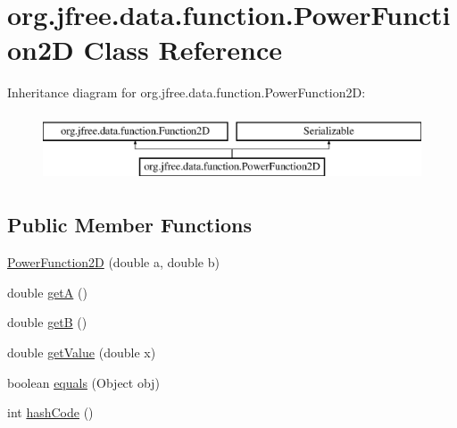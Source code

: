 \hypertarget{classorg_1_1jfree_1_1data_1_1function_1_1_power_function2_d}{}\section{org.\+jfree.\+data.\+function.\+Power\+Function2D Class Reference}
\label{classorg_1_1jfree_1_1data_1_1function_1_1_power_function2_d}
Inheritance diagram for org.\+jfree.\+data.\+function.\+Power\+Function2D\+:\begin{figure}[H]
\begin{center}
\leavevmode
\includegraphics[height=2.000000cm]{classorg_1_1jfree_1_1data_1_1function_1_1_power_function2_d}
\end{center}
\end{figure}
\subsection*{Public Member Functions}
\begin{DoxyCompactItemize}
\item 
\mbox{\hyperlink{classorg_1_1jfree_1_1data_1_1function_1_1_power_function2_d_ac6ed09de67df6c10619978a3d8f043b4}{Power\+Function2D}} (double a, double b)
\item 
double \mbox{\hyperlink{classorg_1_1jfree_1_1data_1_1function_1_1_power_function2_d_a838076a4dd8be578d2831597b6344b58}{getA}} ()
\item 
double \mbox{\hyperlink{classorg_1_1jfree_1_1data_1_1function_1_1_power_function2_d_ad872da611f29ba94f8a1466e79937ddb}{getB}} ()
\item 
double \mbox{\hyperlink{classorg_1_1jfree_1_1data_1_1function_1_1_power_function2_d_a28cc5f0b43b89599f306191d83b99f6c}{get\+Value}} (double x)
\item 
boolean \mbox{\hyperlink{classorg_1_1jfree_1_1data_1_1function_1_1_power_function2_d_a7764f63c2a8f53062c47991078cc0e83}{equals}} (Object obj)
\item 
int \mbox{\hyperlink{classorg_1_1jfree_1_1data_1_1function_1_1_power_function2_d_a84a9d7312e196d03a8dd83b90c144a81}{hash\+Code}} ()
\end{DoxyCompactItemize}



